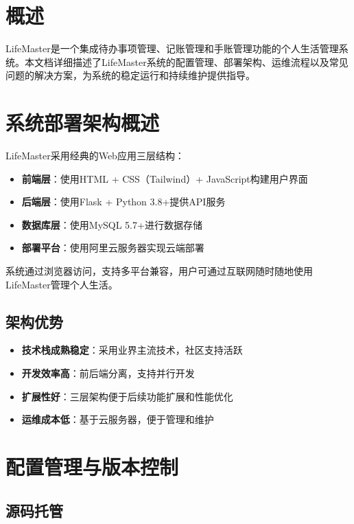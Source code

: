 \documentclass[a4paper]{article}
\begin{document}
\section{概述}

LifeMaster是一个集成待办事项管理、记账管理和手账管理功能的个人生活管理系统。本文档详细描述了LifeMaster系统的配置管理、部署架构、运维流程以及常见问题的解决方案，为系统的稳定运行和持续维护提供指导。

\section{系统部署架构概述}

LifeMaster采用经典的Web应用三层结构：

\begin{itemize}
    \item \textbf{前端层}：使用HTML + CSS（Tailwind）+ JavaScript构建用户界面
    \item \textbf{后端层}：使用Flask + Python 3.8+提供API服务
    \item \textbf{数据库层}：使用MySQL 5.7+进行数据存储
    \item \textbf{部署平台}：使用阿里云服务器实现云端部署
\end{itemize}

系统通过浏览器访问，支持多平台兼容，用户可通过互联网随时随地使用LifeMaster管理个人生活。

\subsection{架构优势}

\begin{itemize}
    \item \textbf{技术栈成熟稳定}：采用业界主流技术，社区支持活跃
    \item \textbf{开发效率高}：前后端分离，支持并行开发
    \item \textbf{扩展性好}：三层架构便于后续功能扩展和性能优化
    \item \textbf{运维成本低}：基于云服务器，便于管理和维护
\end{itemize}

\section{配置管理与版本控制}

\subsection{源码托管}
\end{document}
